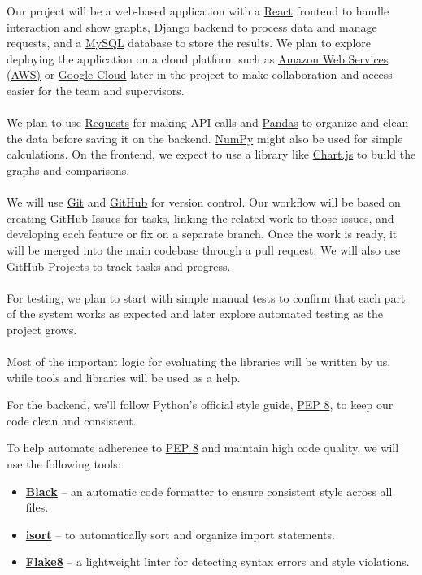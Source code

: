\documentclass{article}
\begin{document}
Our project will be a web-based application with a \href{https://react.dev/}{React} frontend to handle interaction and show graphs, \href{https://www.djangoproject.com/}{Django} backend to process data and manage requests, and a \href{https://www.mysql.com/}{MySQL} database to store the results. We plan to explore deploying the application on a cloud platform such as \href{https://aws.amazon.com/}{Amazon Web Services (AWS)} or \href{https://cloud.google.com/}{Google Cloud} later in the project to make collaboration and access easier for the team and supervisors.\\ \\
We plan to use \href{https://pypi.org/project/requests/}{Requests} for making API calls and \href{https://pypi.org/project/pandas/}{Pandas} to organize and clean the data before saving it on the backend. \href{https://pypi.org/project/numpy/}{NumPy} might also be used for simple calculations. On the frontend, we expect to use a library like \href{https://www.chartjs.org/}{Chart.js} to build the graphs and comparisons.\\ \\
We will use \href{https://git-scm.com/}{Git} and \href{https://github.com/thaafei/DomainX}{GitHub} for version control. Our workflow will be based on creating \href{https://github.com/thaafei/DomainX/issues}{GitHub Issues} for tasks, linking the related work to those issues, and developing each feature or fix on a separate branch. Once the work is ready, it will be merged into the main codebase through a pull request. We will also use \href{https://github.com/users/thaafei/projects/6}{GitHub Projects} to track tasks and progress.\\ \\
For testing, we plan to start with simple manual tests to confirm that each part of the system works as expected and later explore automated testing as the project grows.\\ \\
Most of the important logic for evaluating the libraries will be written by us, while tools and libraries will be used as a help.

For the backend, we’ll follow Python’s official style guide, \href{https://peps.python.org/pep-0008/}{PEP 8}, to keep our code clean and consistent.

To help automate adherence to \href{https://peps.python.org/pep-0008/}{PEP 8} and maintain high code quality, we will use the following tools:
\begin{itemize}
  \item \textbf{\href{https://github.com/psf/black}{Black}} – an automatic code formatter to ensure consistent style across all files.
  \item \textbf{\href{https://pycqa.github.io/isort/}{isort}} – to automatically sort and organize import statements.
  \item \textbf{\href{https://flake8.pycqa.org/en/latest/}{Flake8}} – a lightweight linter for detecting syntax errors and style violations.
\end{itemize}
\end{document}
